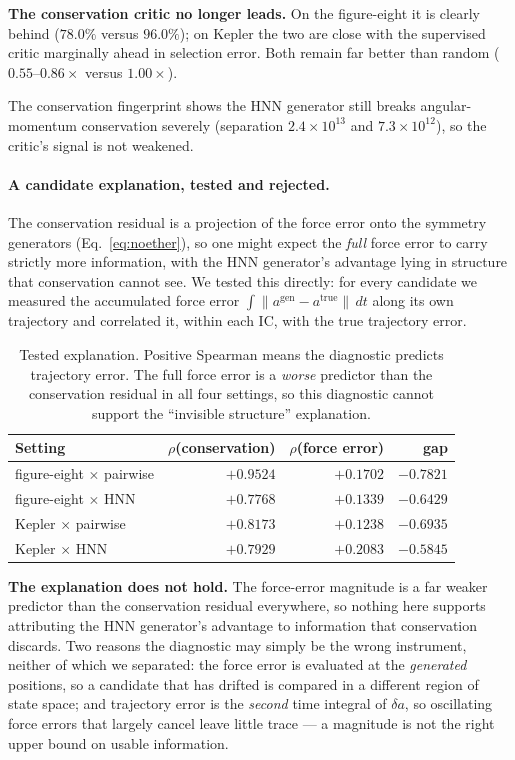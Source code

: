 \documentclass[11pt]{article}
\begin{document}
\textbf{The conservation critic no longer leads.} On the figure-eight it is clearly
behind ($78.0\%$ versus $96.0\%$); on Kepler the two are close with the supervised critic
marginally ahead in selection error. Both remain far better than random
($0.55$--$0.86\times$ versus $1.00\times$).

The conservation fingerprint shows the HNN generator still breaks angular-momentum
conservation severely (separation $2.4\times10^{13}$ and $7.3\times10^{12}$), so the
critic's signal is not weakened.

\paragraph{A candidate explanation, tested and rejected.}
The conservation residual is a projection of the force error onto the symmetry generators
(Eq.~\ref{eq:noether}), so one might expect the \emph{full} force error to carry strictly
more information, with the HNN generator's advantage lying in structure that conservation
cannot see. We tested this directly: for every candidate we measured the accumulated force
error $\int\lVert a^{\text{gen}}-a^{\text{true}}\rVert\,dt$ along its own trajectory and
correlated it, within each IC, with the true trajectory error.

\begin{table}[t]
\centering
\small
\caption{Tested explanation. Positive Spearman means the diagnostic predicts trajectory
error. The full force error is a \emph{worse} predictor than the conservation residual in
all four settings, so this diagnostic cannot support the ``invisible structure''
explanation.}
\label{tab:decomp}
\begin{tabular}{lrrr}
\toprule
Setting & $\rho$(conservation) & $\rho$(force error) & gap \\
\midrule
figure-eight $\times$ pairwise & $+0.9524$ & $+0.1702$ & $-0.7821$ \\
figure-eight $\times$ HNN & $+0.7768$ & $+0.1339$ & $-0.6429$ \\
Kepler $\times$ pairwise & $+0.8173$ & $+0.1238$ & $-0.6935$ \\
Kepler $\times$ HNN & $+0.7929$ & $+0.2083$ & $-0.5845$ \\
\bottomrule
\end{tabular}
\end{table}

\textbf{The explanation does not hold.} The force-error magnitude is a far weaker
predictor than the conservation residual everywhere, so nothing here supports attributing
the HNN generator's advantage to information that conservation discards. Two reasons the
diagnostic may simply be the wrong instrument, neither of which we separated: the force
error is evaluated at the \emph{generated} positions, so a candidate that has drifted is
compared in a different region of state space; and trajectory error is the \emph{second}
time integral of $\delta a$, so oscillating force errors that largely cancel leave little
trace --- a magnitude is not the right upper bound on usable information.
\end{document}
